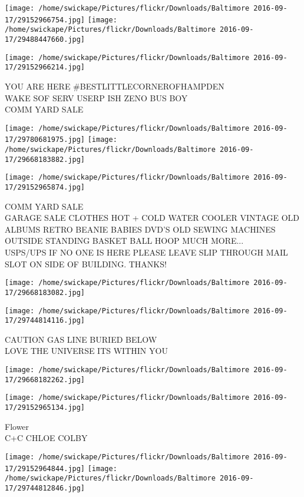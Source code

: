 \documentclass[10pt,letterpaper]{article}
\begin{document}
\texttt{[image: /home/swickape/Pictures/flickr/Downloads/Baltimore 2016-09-17/29152966754.jpg]}
\texttt{[image: /home/swickape/Pictures/flickr/Downloads/Baltimore 2016-09-17/29488447660.jpg]}

\vspace{0.25in}
\texttt{[image: /home/swickape/Pictures/flickr/Downloads/Baltimore 2016-09-17/29152966214.jpg]}

YOU ARE HERE \#BESTLITTLECORNEROFHAMPDEN\\
WAKE SOF SERV USERP ISH ZENO BUS  BOY\\
COMM YARD SALE
\pagebreak

\texttt{[image: /home/swickape/Pictures/flickr/Downloads/Baltimore 2016-09-17/29780681975.jpg]}
\texttt{[image: /home/swickape/Pictures/flickr/Downloads/Baltimore 2016-09-17/29668183882.jpg]}

\texttt{[image: /home/swickape/Pictures/flickr/Downloads/Baltimore 2016-09-17/29152965874.jpg]}

COMM YARD SALE\\
GARAGE SALE CLOTHES HOT + COLD WATER COOLER VINTAGE OLD ALBUMS RETRO BEANIE BABIES DVD'S OLD SEWING MACHINES OUTSIDE STANDING BASKET BALL HOOP MUCH MORE...\\
USPS/UPS IF NO ONE IS HERE PLEASE LEAVE SLIP THROUGH MAIL SLOT ON SIDE OF BUILDING.  THANKS!
\pagebreak

\texttt{[image: /home/swickape/Pictures/flickr/Downloads/Baltimore 2016-09-17/29668183082.jpg]}

\vspace{0.25in}
\texttt{[image: /home/swickape/Pictures/flickr/Downloads/Baltimore 2016-09-17/29744814116.jpg]}

CAUTION GAS LINE BURIED BELOW\\
LOVE THE UNIVERSE ITS WITHIN YOU
\pagebreak

\texttt{[image: /home/swickape/Pictures/flickr/Downloads/Baltimore 2016-09-17/29668182262.jpg]}

\vspace{0.25in}
\texttt{[image: /home/swickape/Pictures/flickr/Downloads/Baltimore 2016-09-17/29152965134.jpg]}

Flower\\
C+C CHLOE COLBY
\pagebreak

\texttt{[image: /home/swickape/Pictures/flickr/Downloads/Baltimore 2016-09-17/29152964844.jpg]}
\texttt{[image: /home/swickape/Pictures/flickr/Downloads/Baltimore 2016-09-17/29744812846.jpg]}
\end{document}
